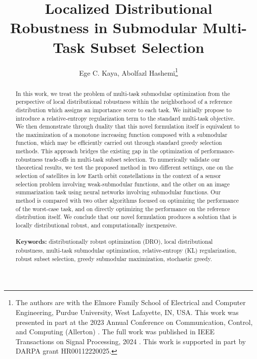 \documentclass[letter,11pt]{article}
\title{\textbf{Localized Distributional Robustness in Submodular Multi-Task Subset Selection}}
\date{}
\author{Ege C. Kaya, Abolfazl Hashemi\thanks{The authors are with the Elmore Family School of Electrical and Computer Engineering, Purdue University, West Lafayette, IN, USA. This work was presented in part at the 2023 Annual Conference on Communication, Control, and Computing (Allerton) \cite{10313462}. The full work was published in IEEE Transactions on Signal Processing, 2024 \cite{TSP}. This work is supported in part by DARPA grant HR00112220025.}}
\begin{document}
\maketitle
\begin{abstract}
In this work, we treat the problem of multi-task submodular optimization from the perspective of local distributional robustness within the neighborhood of a reference distribution which assigns an importance score to each task. We initially propose to introduce a relative-entropy regularization term to the standard multi-task objective. We then demonstrate through duality that this novel formulation 
itself is equivalent to the maximization of a monotone increasing function composed with a submodular function, which may be efficiently carried out through standard greedy selection methods. This approach bridges the existing gap in the optimization of performance-robustness trade-offs in multi-task subset selection. To numerically validate our theoretical results, we test the proposed method in two different settings, one on the selection of satellites in low Earth orbit constellations in the context of a sensor selection problem involving weak-submodular functions, and the other on an image summarization task using neural networks involving submodular functions. Our method is compared with two other algorithms focused on optimizing the performance of the worst-case task, and on directly optimizing the performance on the reference distribution itself. We conclude that our novel formulation produces a solution that is locally distributional robust, and computationally inexpensive.
\\\\\noindent
\textbf{Keywords:} distributionally robust optimization (DRO), local distributional robustness, multi-task submodular optimization, relative-entropy (KL) regularization, robust subset selection, greedy submodular maximization, stochastic greedy.
\end{abstract}
\end{document}
